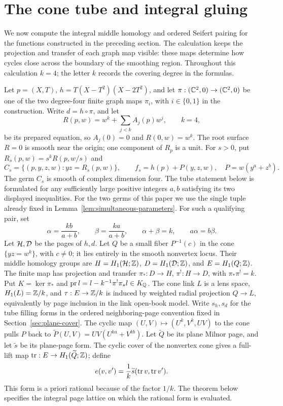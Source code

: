\section{The cone tube and integral gluing}\label{sec:tube}

We now compute the integral middle homology and ordered Seifert
pairing for the functions constructed in the preceding section.
The calculation keeps the projection and transfer of each graph
map visible: these maps determine how cycles close across the
boundary of the smoothing region. Throughout this calculation
\(k=4\); the letter \(k\) records the covering degree in the formulas.

Let \(p=(X,T)\), \(h=T(X-T^2)(X-2T^2)\), and let
\(\pi:(\mathbb C^2,0)\to(\mathbb C^2,0)\) be one of the two degree-four finite
graph maps \(\pi_i\), with \(i\in\{0,1\}\) in the construction. Write \(d=h\circ\pi\), and let
\[
 R(p,w)=w^k+\sum_{j<k}A_j(p)w^j,\qquad k=4,
\]
be its prepared equation, so \(A_j(0)=0\) and \(R(0,w)=w^k\).
The root surface \(R=0\) is smooth near the origin; one component of \(R_p\)
is a unit. For \(s>0\), put \(R_s(p,w)=s^kR(p,w/s)\) and
\[
C_s=\{(p,y,z,w):yz=R_s(p,w)\},\qquad
f_s=h(p)+P(y,z,w),\quad P=w(y^a+z^b).
\]
The germ \(C_s\) is smooth of complex dimension four. The tube
statement below is formulated for any sufficiently large positive
integers \(a,b\) satisfying its two displayed inequalities. For the
two germs of this paper we use the single tuple already fixed in
Lemma~\ref{lem:simultaneous-parameters}. For such a qualifying pair, set
\[
\alpha=\frac{kb}{a+b},\qquad \beta=\frac{ka}{a+b},\qquad
\alpha+\beta=k,\qquad a\alpha=b\beta.
\]
Let \(\mathcal H,\mathcal D\) be the pages of \(h,d\). Let \(Q\) be a small
fiber \(P^{-1}(c)\) in the cone \(\{yz=w^k\}\), with \(c\ne0\);
it lies entirely in the smooth nonvertex locus.
Their middle homology groups are
\(H=H_1(\mathcal H;\mathbb Z)\), \(D=H_1(\mathcal D;\mathbb Z)\), and \(E=H_1(Q;\mathbb Z)\).
The finite map has projection and transfer \(\pi_*:D\to H\),
\(\pi^!:H\to D\), with \(\pi_*\pi^!=k\). Put
\(K=\ker\pi_*\) and
\(\operatorname{pr} l=l-k^{-1}\pi^!\pi_*l\in K_\mathbb Q\).
The cone link \(L\) is a lens space, \(H_1(L)=\mathbb Z/k\), and
\(\tau:E\to\mathbb Z/k\) is induced by weighted radial projection
\(Q\to L\), equivalently by page inclusion in the link open-book model.
Write \(s_h,s_d\) for the tube filling forms in the ordered
neighboring-page convention fixed in Section~\ref{sec:plane-cover}.
The cyclic map \((U,V)\mapsto(U^k,V^k,UV)\) to the cone pulls
\(P\) back to \(\widetilde P(U,V)=UV(U^{ka}+V^{kb})\).
Let \(\widetilde Q\) be its plane Milnor page, and let
\(\widetilde s\) be its plane-page form. The cyclic cover of the
nonvertex cone gives a full-lift map
\(\operatorname{tr}:E\to H_1(\widetilde Q;\mathbb Z)\); define
\[
 e(v,v')=\frac1k\widetilde s(\operatorname{tr} v,\operatorname{tr} v').
\]
This form is a priori rational because of the factor \(1/k\).
The theorem below specifies the integral page lattice on which
the rational form is evaluated.

